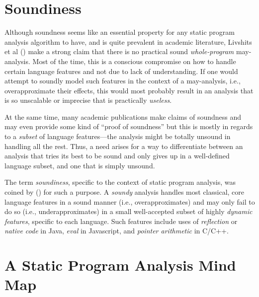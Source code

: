 \section{Soundiness}

Although soundness seems like an essential property for any static program analysis algorithm to have, and is quite prevalent in academic literature, Livshits et al (\todo{}) make a strong claim that there is no practical sound \emph{whole-program} may-analysis. Most of the time, this is a conscious compromise on how to handle certain language features and not due to lack of understanding. If one would attempt to soundly model such features in the context of a may-analysis, i.e., overapproximate their effects, this would most probably result in an analysis that is so unscalable or imprecise that is practically \emph{useless}.

At the same time, many academic publications make claims of soundness and may even provide some kind of ``proof of soundness'' but this is mostly in regards to a \emph{subset} of language features---the analysis might be totally unsound in handling all the rest. Thus, a need arises for a way to differentiate between an analysis that tries its best to be sound and only gives up in a well-defined language subset, and one that is simply unsound.

The term \emph{soundiness}, specific to the context of static program analysis, was coined by (\todo{}) for such a purpose. A \emph{soundy} analysis handles most classical, core language features in a sound manner (i.e., overapproximates) and may only fail to do so (i.e., underapproximates) in a small well-accepted subset of highly \emph{dynamic features}, specific to each language. Such features include uses of \emph{reflection} or \emph{native code} in Java, \emph{eval} in Javascript, and \emph{pointer arithmetic} in C/C++.


\section{A Static Program Analysis Mind Map}

